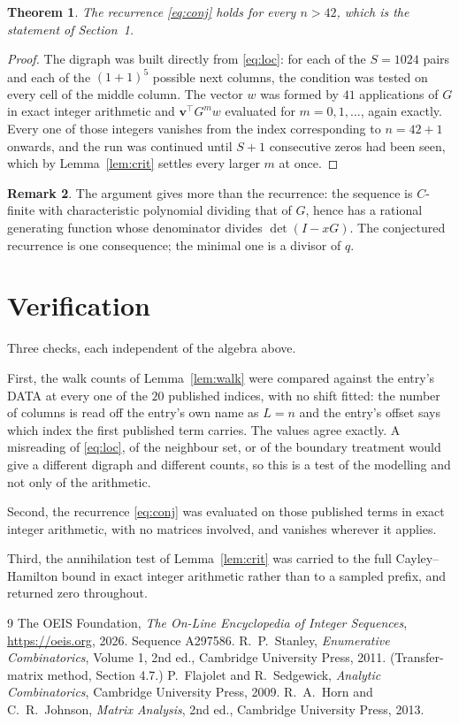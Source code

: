 \documentclass[11pt,a4paper]{article}
\theoremstyle{plain}
\newtheorem{theorem}{Theorem}
\theoremstyle{definition}
\newtheorem{remark}[theorem]{Remark}
\begin{document}
\begin{theorem}
The recurrence \eqref{eq:conj} holds for every $n>42$, which is the statement of
Section~1.
\end{theorem}

\begin{proof}
The digraph was built directly from \eqref{eq:loc}: for each of the $S=1024$ pairs and each
of the $(1+1)^{5}$ possible next columns, the condition was tested on every cell of
the middle column. The vector $w$ was formed by $41$ applications of $G$ in exact integer
arithmetic and $\mathbf{v}^{\!\top}G^{m}w$ evaluated for $m=0,1,\dots$, again exactly.
Every one of those integers vanishes from the index corresponding to $n=42+1$ onwards,
and the run was continued until $S+1$ consecutive zeros had been seen, which by
Lemma~\ref{lem:crit} settles every larger $m$ at once.
\end{proof}

\begin{remark}
The argument gives more than the recurrence: the sequence is $C$-finite with characteristic
polynomial dividing that of $G$, hence has a rational generating function whose denominator
divides $\det(I-xG)$. The conjectured recurrence is one consequence; the minimal one is a
divisor of $q$.
\end{remark}

\section{Verification}

Three checks, each independent of the algebra above.

First, the walk counts of Lemma~\ref{lem:walk} were compared against the entry's DATA at
every one of the $20$ published indices, with no shift fitted: the number of columns is
read off the entry's own name as $L=n$ and the entry's offset says which index the first
published term carries. The values agree exactly. A misreading of \eqref{eq:loc}, of the
neighbour set, or of the boundary treatment would give a different digraph and different
counts, so this is a test of the modelling and not only of the arithmetic.

Second, the recurrence \eqref{eq:conj} was evaluated on those published terms in exact
integer arithmetic, with no matrices involved, and vanishes wherever it applies.

Third, the annihilation test of Lemma~\ref{lem:crit} was carried to the full
Cayley--Hamilton bound in exact integer arithmetic rather than to a sampled prefix, and
returned zero throughout.

\begin{thebibliography}{9}
 The OEIS Foundation, \emph{The On-Line Encyclopedia of Integer
Sequences}, \url{https://oeis.org}, 2026. Sequence A297586.
 R.~P.~Stanley, \emph{Enumerative Combinatorics}, Volume 1, 2nd ed.,
Cambridge University Press, 2011. (Transfer-matrix method, Section 4.7.)
 P.~Flajolet and R.~Sedgewick, \emph{Analytic Combinatorics}, Cambridge
University Press, 2009.
 R.~A.~Horn and C.~R.~Johnson, \emph{Matrix Analysis}, 2nd ed., Cambridge
University Press, 2013.
\end{thebibliography}
\end{document}
